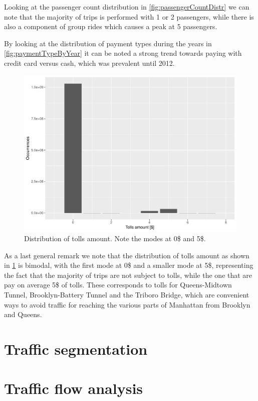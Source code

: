 \documentclass{acm_proc_article-sp-sigmod09}
\begin{document}
Looking at the passenger count distribution in \cref{fig:passengerCountDistr} we can note that the majority of trips is performed with 1 or 2 passengers, while there is also a component of group rides which causes a peak at 5 passengers.

By looking at the distribution of payment types during the years in \cref{fig:paymentTypeByYear} it can be noted a strong trend towards paying with credit card versus cash, which was prevalent until 2012.

\begin{figure}
	\centering
	\includegraphics[width=1\columnwidth]{resources/base_plots/tolls_amount_distr.pdf}
	\caption{Distribution of tolls amount. Note the modes at 0\$ and 5\$.}
	\label{fig:tollsAmountDistr}
\end{figure}

As a last general remark we note that the distribution of tolls amount as shown in \cref{fig:tollsAmountDistr} is bimodal, with the first mode at 0\$ and a smaller mode at 5\$, representing the fact that the majority of trips are not subject to tolls, while the one that are pay on average 5\$ of tolls. These corresponds to tolls for Queens-Midtown Tunnel, Brooklyn-Battery Tunnel and the Triboro Bridge, which are convenient ways to avoid traffic for reaching the various parts of Manhattan from Brooklyn and Queens.

\section{Traffic segmentation}

\section{Traffic flow analysis}
\end{document}

